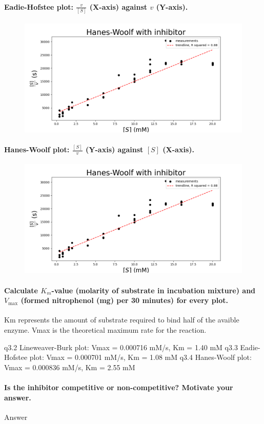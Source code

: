 \documentclass[a4paper,12pt]{article}
\begin{document}
\paragraph{Eadie-Hofstee plot: $\frac{v}{[S]}$ (X-axis) against $v$ (Y-axis).}

\begin{figure}[!ht]
    \includegraphics[scale=0.5]{fig3_4.png}
    \centering
\end{figure}

\paragraph{Hanes-Woolf plot: $\frac{[S]}{v}$ (Y-axis) against $[S]$ (X-axis).}

\begin{figure}[!ht]
    \includegraphics[scale=0.5]{fig3_4.png}
    \centering
\end{figure}

\paragraph{Calculate $K_m$-value (molarity of substrate in incubation mixture) and $V_{\text{max}}$ (formed nitrophenol (mg) per 30 minutes) for every plot.}
Km represents the amount of substrate required to bind half of the avaible enzyme.
Vmax is the theoretical maximum rate for the reaction.

q3.2 Lineweaver-Burk plot: Vmax = 0.000716 mM/s, Km = 1.40 mM
q3.3 Eadie-Hofstee plot: Vmax = 0.000701 mM/s, Km = 1.08 mM
q3.4 Hanes-Woolf plot: Vmax = 0.000836 mM/s, Km = 2.55 mM

\paragraph{Is the inhibitor competitive or non-competitive? Motivate your answer.}

Answer\\
\end{document}
